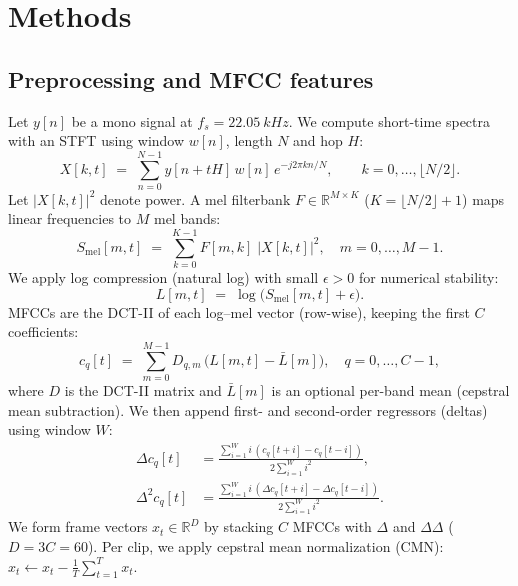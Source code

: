 \documentclass[11pt]{article}
\newcommand{\D}{\ensuremath{D}\xspace}
\begin{document}
\section{Methods}

\subsection*{Preprocessing and MFCC features}
Let $y[n]$ be a mono signal at $f_s=\SI{22.05}{kHz}$. We compute short-time spectra with an STFT using window $w[n]$, length $N$ and hop $H$:
\begin{equation}
X[k,t] \;=\; \sum_{n=0}^{N-1} y[n+tH]\,w[n]\,e^{-j2\pi kn/N}, \qquad k=0,\dots,\lfloor N/2\rfloor.
\end{equation}
Let $|X[k,t]|^2$ denote power. A mel filterbank $F\!\in\!\mathbb{R}^{M\times K}$ ($K{=}\lfloor N/2\rfloor{+}1$) maps linear frequencies to $M$ mel bands:
\begin{equation}
S_{\mathrm{mel}}[m,t] \;=\; \sum_{k=0}^{K-1} F[m,k]\;|X[k,t]|^2,\quad m=0,\dots,M{-}1.
\end{equation}
We apply log compression (natural log) with small $\epsilon{>}0$ for numerical stability:
\begin{equation}
L[m,t] \;=\; \log \!\big(S_{\mathrm{mel}}[m,t]+\epsilon\big).
\end{equation}
MFCCs are the DCT-II of each log–mel vector (row-wise), keeping the first $C$ coefficients:
\begin{equation}
c_q[t] \;=\; \sum_{m=0}^{M-1} D_{q,m}\,\big(L[m,t]-\bar L[m]\big), \quad q=0,\dots,C{-}1,
\end{equation}
where $D$ is the DCT-II matrix and $\bar L[m]$ is an optional per-band mean (cepstral mean subtraction). We then append first- and second-order regressors (deltas) using window $W$:
\begin{align}
\Delta c_q[t] &= \frac{\sum_{i=1}^{W} i\,(c_q[t{+}i]-c_q[t{-}i])}{2\sum_{i=1}^{W} i^2}, \\
\Delta^2 c_q[t] &= \frac{\sum_{i=1}^{W} i\,(\Delta c_q[t{+}i]-\Delta c_q[t{-}i])}{2\sum_{i=1}^{W} i^2}.
\end{align}
We form frame vectors $x_t \in \mathbb{R}^{\D}$ by stacking $C$ MFCCs with $\Delta$ and $\Delta\Delta$ ($\D=3C=60$). Per clip, we apply cepstral mean normalization (CMN): $x_t \leftarrow x_t - \frac{1}{T}\sum_{t=1}^{T} x_t$.
\end{document}
